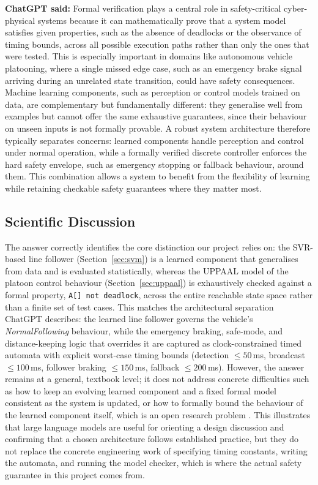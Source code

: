 \documentclass[english]{lni}
\begin{document}
\textbf{ChatGPT said:} Formal verification plays a central role in safety-critical cyber-physical systems because it can mathematically prove that a system model satisfies given properties, such as the absence of deadlocks or the observance of timing bounds, across all possible execution paths rather than only the ones that were tested. This is especially important in domains like autonomous vehicle platooning, where a single missed edge case, such as an emergency brake signal arriving during an unrelated state transition, could have safety consequences. Machine learning components, such as perception or control models trained on data, are complementary but fundamentally different: they generalise well from examples but cannot offer the same exhaustive guarantees, since their behaviour on unseen inputs is not formally provable. A robust system architecture therefore typically separates concerns: learned components handle perception and control under normal operation, while a formally verified discrete controller enforces the hard safety envelope, such as emergency stopping or fallback behaviour, around them. This combination allows a system to benefit from the flexibility of learning while retaining checkable safety guarantees where they matter most.

\subsection{Scientific Discussion}
The answer correctly identifies the core distinction our project relies on: the SVR-based line follower (Section~\ref{sec:svm}) is a learned component that generalises from data and is evaluated statistically, whereas the UPPAAL model of the platoon control behaviour (Section~\ref{sec:uppaal}) is exhaustively checked against a formal property, \texttt{A[] not deadlock}, across the entire reachable state space rather than a finite set of test cases. This matches the architectural separation ChatGPT describes: the learned line follower governs the vehicle's \emph{NormalFollowing} behaviour, while the emergency braking, safe-mode, and distance-keeping logic that overrides it are captured as clock-constrained timed automata with explicit worst-case timing bounds (detection $\leq 50$\,ms, broadcast $\leq 100$\,ms, follower braking $\leq 150$\,ms, fallback $\leq 200$\,ms). However, the answer remains at a general, textbook level; it does not address concrete difficulties such as how to keep an evolving learned component and a fixed formal model consistent as the system is updated, or how to formally bound the behaviour of the learned component itself, which is an open research problem \cite{GGK25}. This illustrates that large language models are useful for orienting a design discussion and confirming that a chosen architecture follows established practice, but they do not replace the concrete engineering work of specifying timing constants, writing the automata, and running the model checker, which is where the actual safety guarantee in this project comes from.
\end{document}

